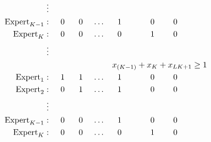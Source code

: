 \begin{align*}
     \vdots  & \\
\textnormal{Expert}_{K-1}: & \hspace{0.5cm} 0 \hspace{0.6cm} 0 \hspace{0.42cm} \dots \hspace{0.53cm} 1  \hspace{1.23cm} 0 \hspace{0.8cm} 0 \\
\textnormal{Expert}_{K}: & \hspace{0.5cm} 0 \hspace{0.6cm} 0 \hspace{0.42cm} \dots \hspace{0.53cm} 0  \hspace{1.23cm} 1 \hspace{0.8cm} 0 \\
     \vdots  & \\
     & \hspace{2.7cm} x_{(K-1)} + x_{K} + x_{LK+1} \ge 1\\
\textnormal{Expert}_{1}: & \hspace{0.5cm} 1 \hspace{0.6cm} 1 \hspace{0.42cm} \dots \hspace{0.53cm} 1  \hspace{1.23cm} 0 \hspace{0.8cm} 0 \\
\textnormal{Expert}_{2}: & \hspace{0.5cm} 0 \hspace{0.6cm} 1 \hspace{0.42cm} \dots \hspace{0.53cm} 1  \hspace{1.23cm} 0 \hspace{0.8cm} 0 \\
     \vdots  & \\
\textnormal{Expert}_{K-1}: & \hspace{0.5cm} 0 \hspace{0.6cm} 0 \hspace{0.42cm} \dots \hspace{0.53cm} 1  \hspace{1.23cm} 0 \hspace{0.8cm} 0 \\
\textnormal{Expert}_{K}: & \hspace{0.5cm} 0 \hspace{0.6cm} 0 \hspace{0.42cm} \dots \hspace{0.53cm} 0  \hspace{1.23cm} 1 \hspace{0.8cm} 0 \\
\end{align*}

